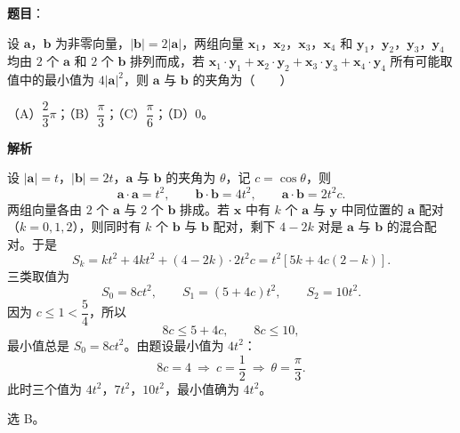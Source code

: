 \begin{answer}

\textbf{题目}：

设 $\boldsymbol a$，$\boldsymbol b$ 为非零向量，$|\boldsymbol b|=2|\boldsymbol a|$，两组向量 $\boldsymbol x_1$，$\boldsymbol x_2$，$\boldsymbol x_3$，$\boldsymbol x_4$ 和 $\boldsymbol y_1$，$\boldsymbol y_2$，$\boldsymbol y_3$，$\boldsymbol y_4$ 均由 $2$ 个 $\boldsymbol a$ 和 $2$ 个 $\boldsymbol b$ 排列而成，若 $\boldsymbol x_1\cdot\boldsymbol y_1+\boldsymbol x_2\cdot\boldsymbol y_2+\boldsymbol x_3\cdot\boldsymbol y_3+\boldsymbol x_4\cdot\boldsymbol y_4$ 所有可能取值中的最小值为 $4|\boldsymbol a|^2$，则 $\boldsymbol a$ 与 $\boldsymbol b$ 的夹角为\mbox{（　　）}

（A）$\dfrac23\pi$；（B）$\dfrac\pi3$；（C）$\dfrac\pi6$；（D）$0$。

\textbf{解析}

设 $|\boldsymbol a|=t$，$|\boldsymbol b|=2t$，$\boldsymbol a$ 与 $\boldsymbol b$ 的夹角为 $\theta$，记 $c=\cos\theta$，则
\nopagebreak[4]
\[\boldsymbol a\cdot\boldsymbol a=t^2,\qquad \boldsymbol b\cdot\boldsymbol b=4t^2,\qquad \boldsymbol a\cdot\boldsymbol b=2t^2c .\]
两组向量各由 $2$ 个 $\boldsymbol a$ 与 $2$ 个 $\boldsymbol b$ 排成。若 $\boldsymbol x$ 中有 $k$ 个 $\boldsymbol a$ 与 $\boldsymbol y$ 中同位置的 $\boldsymbol a$ 配对（$k=0,1,2$），则同时有 $k$ 个 $\boldsymbol b$ 与 $\boldsymbol b$ 配对，剩下 $4-2k$ 对是 $\boldsymbol a$ 与 $\boldsymbol b$ 的混合配对。于是
\nopagebreak[4]
\[S_k=kt^2+4kt^2+(4-2k)\cdot2t^2c
=t^2\left[5k+4c(2-k)\right].\]
三类取值为
\nopagebreak[4]
\[S_0=8ct^2,\qquad S_1=(5+4c)t^2,\qquad S_2=10t^2 .\]
因为 $c\leqslant1<\dfrac54$，所以
\nopagebreak[4]
\[8c\leqslant5+4c,\qquad 8c\leqslant10,\]
最小值总是 $S_0=8ct^2$。由题设最小值为 $4t^2$：
\nopagebreak[4]
\[8c=4\ \Longrightarrow\ c=\frac12\ \Longrightarrow\ \theta=\frac\pi3 .\]
此时三个值为 $4t^2$，$7t^2$，$10t^2$，最小值确为 $4t^2$。

选 B。


\end{answer}
